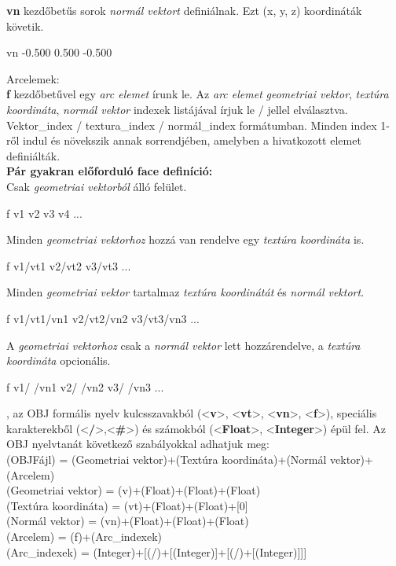\noindent \textbf{vn} kezdőbetűs sorok \textsl{normál vektort} definiálnak. Ezt  (x, y, z) koordináták követik.
\bigskip
\begin{python} 
vn -0.500 0.500 -0.500
\end{python}
\bigskip
Arcelemek:\\

\noindent \textbf{f} kezdőbetűvel egy \textsl{arc elemet} írunk le. Az \textsl{arc elemet} \textsl{geometriai vektor}, \textsl{textúra koordináta}, \textsl{normál vektor} indexek listájával írjuk le {/} jellel elválasztva. Vektor{\_}index {/} textura{\_}index {/}  normál{\_}index formátumban. Minden index 1-ről indul és növekszik annak sorrendjében, amelyben a hivatkozott elemet definiálták.\\

\noindent \textbf{Pár gyakran előforduló face definíció:}\\

\noindent Csak \textsl{geometriai vektorból} álló felület.
\bigskip
\begin{python} 
f v1 v2 v3 v4 ...
\end{python}
\bigskip
 Minden \textsl{geometriai vektorhoz} hozzá van rendelve egy \textsl{textúra koordináta} is.
\begin{python} 
f v1/vt1 v2/vt2 v3/vt3 ...
\end{python}
\bigskip
Minden \textsl{geometriai vektor} tartalmaz \textsl{textúra koordinátát} és \textsl{normál vektort}.
\bigskip
\begin{python} 
f v1/vt1/vn1 v2/vt2/vn2 v3/vt3/vn3 ...
\end{python}
\bigskip
A \textsl{geometriai vektorhoz} csak a \textsl{normál vektor} lett hozzárendelve, a \textsl{textúra koordináta} opcionális.
\bigskip
\begin{python} 
f v1/ /vn1 v2/ /vn2 v3/ /vn3 ...
\end{python}
\newpage
{}, az OBJ formális nyelv kulcsszavakból (<\textbf{v}>, <\textbf{vt}>, <\textbf{vn}>, <\textbf{f}>), speciális karakterekből (<\textbf{/}>,<\textbf{\#}>) és számokból (<\textbf{Float}>, <\textbf{Integer}>) épül fel. Az OBJ nyelvtanát következő szabályokkal adhatjuk meg:\\

\noindent(OBJFájl) = {(Geometriai vektor)}+{(Textúra koordináta)}+{(Normál vektor)}+{(Arcelem)}\\
(Geometriai vektor) = (v)+(Float)+(Float)+(Float)\\
(Textúra koordináta) = (vt)+(Float)+(Float)+[0]\\
(Normál vektor) = (vn)+(Float)+(Float)+(Float)\\
(Arcelem) = (f)+{(Arc{\_}indexek)}\\
(Arc{\_}indexek) = (Integer)+[(/)+[(Integer)]+[(/)+[(Integer)]]]\\

